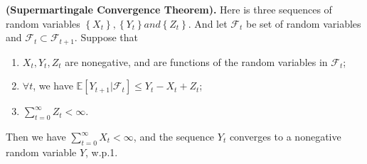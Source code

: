 \begin{theorem}
    \textbf{(Supermartingale Convergence Theorem).}
    Here is three sequences of random variables $ \left\{ X_t \right\}, \left\{ Y_t \right\} and \left\{ Z_t \right\} $.
    And let $ \mathcal{F}_t $ be set of random variables and $ \mathcal{F}_t \subset \mathcal{F}_{t+1} $.
    Suppose that
    \begin{enumerate}
        \item $ X_t, Y_t, Z_t $ are nonegative, and are functions of the random variables in $ \mathcal{F}_t $;
        \item $ \forall t $, we have $ \mathbb{E} \left[ Y_{t+1} | \mathcal{F}_t \right] \le Y_t - X_t + Z_t $;
        \item $ \sum^{\infty}_{t=0} Z_t < \infty $.
    \end{enumerate}
    Then we have $ \sum^{\infty}_{t = 0} X_t < \infty $, and the sequence $ Y_t $ converges to a nonegative random variable $ Y $, w.p.1.
\end{theorem}

